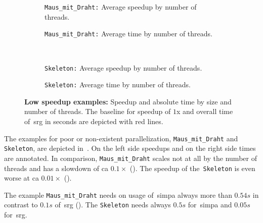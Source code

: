\documentclass{article}
\begin{document}
\begin{figure}[!ht]
  \centering \vskip 0pt
  \begin{subfigure}[t]{0.5\textwidth}%
    \centering \vskip 0pt
    \caption{\texttt{Maus\_mit\_Draht:} Average speedup by number of threads.}\label{fig:mausmitdrahtspeedup}
  \end{subfigure}%
  \begin{subfigure}[t]{0.5\textwidth}%
    \centering \vskip 0pt
    \caption{\texttt{Maus\_mit\_Draht:} Average time by number of threads.}\label{fig:mausmitdrahttime}
  \end{subfigure}%
\\
  \begin{subfigure}[t]{0.5\textwidth}%
    \centering \vskip 0pt
    \caption{\texttt{Skeleton:} Average speedup by number of threads.}\label{fig:skeletonspeedup}
  \end{subfigure}%
  \begin{subfigure}[t]{0.5\textwidth}%
    \centering \vskip 0pt
    \caption{\texttt{Skeleton:} Average time by number of threads.}\label{fig:skeletontime}
  \end{subfigure}%
  \caption{\textbf{Low speedup examples:} Speedup and absolute time by size and number of threads. The baseline for speedup of $1$x and overall time of~\ac{srg} in seconds are depicted with red lines.}\label{fig:realexamplesbad}
\end{figure}%

The examples for poor or non-existent parallelization, \texttt{Maus\_mit\_Draht} and \texttt{Skeleton}, are depicted in~.
On the left side speedups and on the right side times are annotated.
In comparison, \texttt{Maus\_mit\_Draht} scales not at all by the number of threads and has a slowdown of ca $0.1\times $ ().
The speedup of the~\texttt{Skeleton} is even worse at ca $0.01\times $ ().\par
The example \texttt{Maus\_mit\_Draht} needs on usage of~\ac{simpa} always more than $0.54s$ in contrast to $0.1s$ of~\ac{srg} ().
The \texttt{Skeleton} needs always $0.5s$ for~\ac{simpa} and $0.05s$ for~\ac{srg}.
\end{document}

